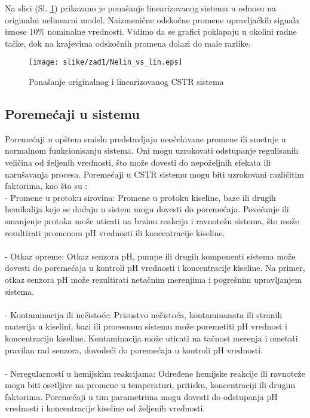 \documentclass[a4paper,11pt]{article}
\theoremstyle{definition} \newtheorem{deff}{Definicija}[section]
\theoremstyle{definition} \newtheorem{prim}[deff]{Primer}
\theoremstyle{plain} \newtheorem{teor}[deff]{Teorema}
\begin{document}
	Na slici (Sl. \ref{fig:nel_lin}) prikazano je ponašanje linearizovanog sistema u odnosu na originalni nelinearni model. Naizmenične odskočne promene upravljačkih signala iznose 10\% nominalne vrednosti. Vidimo da se grafici poklapaju u okolini radne tačke, dok na krajevima odskočnih promena dolazi do male razlike. 
	
	\begin{figure}[!h]
		\centering
		\texttt{[image: slike/zad1/Nelin\_vs\_lin.eps]}
		\caption{Ponašanje originalnog i linearizovanog CSTR sistema }
		\label{fig:nel_lin}
	\end{figure}
	
	\clearpage
	\subsection{Poremećaji u sistemu}
	
	
	Poremećaji u opštem smislu predstavljaju neočekivane promene ili smetnje u normalnom funkcionisanju sistema. Oni mogu uzrokovati odstupanje regulisanih veličina od željenih vrednosti, što može dovesti do nepoželjnih efekata ili narušavanja procesa. Poremećaji u CSTR sistemu mogu biti uzrokovani različitim faktorima, kao što su :\\
	
	- Promene u protoku sirovina: Promene u protoku kiseline, baze ili drugih hemikalija koje se dodaju u sistem mogu dovesti do poremećaja. Povećanje ili smanjenje protoka može uticati na brzinu reakcija i ravnotežu sistema, što može rezultirati promenom pH vrednosti ili koncentracije kiseline.\\\\
	
	- Otkaz opreme: Otkaz senzora pH, pumpe ili drugih komponenti sistema može dovesti do poremećaja u kontroli pH vrednosti i koncentracije kiseline. Na primer, otkaz senzora pH može rezultirati netačnim merenjima i pogrešnim upravljanjem sistema. \\\\
	
	- Kontaminacija ili nečistoće: Prisustvo nečistoća, kontaminanata ili stranih materija u kiselini, bazi ili procesnom sistemu može poremetiti pH vrednost i koncentraciju kiseline. Kontaminacija može uticati na tačnost merenja i ometati pravilan rad senzora, dovodeći do poremećaja u kontroli pH vrednosti. \\\\
	
	- Neregularnosti u hemijskim reakcijama: Određene hemijske reakcije ili ravnoteže mogu biti osetljive na promene u temperaturi, pritisku, koncentraciji ili drugim faktorima. Poremećaji u tim parametrima mogu dovesti do odstupanja pH vrednosti i koncentracije kiseline od željenih vrednosti. \\\\\\
	
\end{document}
